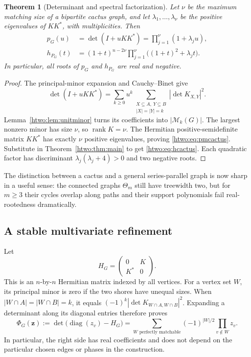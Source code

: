 \documentclass[11pt]{article}
\numberwithin{equation}{section}
\newtheorem{theorem}{Theorem}[section]
\theoremstyle{definition}
\newcommand{\PM}{\mathcal M}
\newcommand{\diag}{\operatorname{diag}}
\newcommand{\rank}{\operatorname{rank}}
\begin{document}
\begin{theorem}[Determinant and spectral factorization]\label{htwo:thm:cactus}
Let $\nu$ be the maximum matching size of a bipartite cactus graph, and
let $\lambda_1,\ldots,\lambda_\nu$ be the positive eigenvalues of $KK^*$,
with multiplicities. Then
\begin{align}
 p_G(u)&=\det(I+uKK^*)=\prod_{j=1}^{\nu}(1+\lambda_j u),
 \label{htwo:eq:pmcactus}\\
 h_{P_G}(t)&=(1+t)^{n-2\nu}
             \prod_{j=1}^{\nu}\bigl((1+t)^2+\lambda_jt\bigr).
 \label{htwo:eq:hcactus}
\end{align}
In particular, all roots of $p_G$ and $h_{P_G}$ are real and negative.
\end{theorem}
\begin{proof}
The principal-minor expansion and Cauchy--Binet give
\[
 \det(I+uKK^*)
 =\sum_{k\ge0}u^k\sum_{\substack{X\subseteq A,\ Y\subseteq B\\|X|=|Y|=k}}
                         |\det K_{X,Y}|^2.
\]
Lemma~\ref{htwo:lem:unitminor} turns its coefficients into $|\PM_k(G)|$.
The largest nonzero minor has size $\nu$, so $\rank K=\nu$.
The Hermitian positive-semidefinite matrix $KK^*$ has exactly $\nu$
positive eigenvalues, proving \eqref{htwo:eq:pmcactus}. Substitute in
Theorem~\ref{htwo:thm:main} to get \eqref{htwo:eq:hcactus}. Each quadratic factor
has discriminant $\lambda_j(\lambda_j+4)>0$ and two negative roots.
\end{proof}

The distinction between a cactus and a general series-parallel graph is
now sharp in a useful sense: the connected graphs $\Theta_m$ still have
treewidth two, but for $m\ge3$ their cycles overlap along paths and their
support polynomials fail real-rootedness dramatically.

\subsection{A stable multivariate refinement}

Let
\[
 H_G=\begin{pmatrix}0&K\\K^*&0\end{pmatrix}.
\]
This is an $n$-by-$n$ Hermitian matrix indexed by all vertices. For a
vertex set $W$, its principal minor is zero if the two shores have
unequal sizes. When $|W\cap A|=|W\cap B|=k$, it equals
$(-1)^k|\det K_{W\cap A,W\cap B}|^2$. Expanding a determinant along its
diagonal entries therefore proves
\begin{equation}
 \Phi_G(\mathbf z):=\det\bigl(\diag(z_v)-H_G\bigr)
 =\sum_{W\text{ perfectly matchable}}(-1)^{|W|/2}
                       \prod_{v\notin W}z_v.
 \label{htwo:eq:multistable}
\end{equation}
In particular, the right side has real coefficients and does not depend
on the particular chosen edges or phases in the construction.
\end{document}
